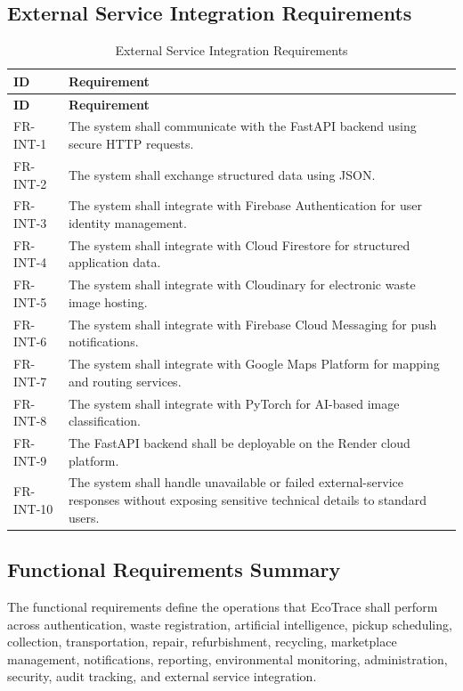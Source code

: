 \subsection{External Service Integration Requirements}
\begin{longtable}{@{}p{2.4cm}p{11cm}@{}}
\caption{External Service Integration Requirements} \label{tab:fr-int} \\
\toprule \textbf{ID} & \textbf{Requirement} \\ \midrule
\endfirsthead
\toprule \textbf{ID} & \textbf{Requirement} \\ \midrule
\endhead
FR-INT-1 & The system shall communicate with the FastAPI backend using secure HTTP requests. \\
FR-INT-2 & The system shall exchange structured data using JSON. \\
FR-INT-3 & The system shall integrate with Firebase Authentication for user identity management. \\
FR-INT-4 & The system shall integrate with Cloud Firestore for structured application data. \\
FR-INT-5 & The system shall integrate with Cloudinary for electronic waste image hosting. \\
FR-INT-6 & The system shall integrate with Firebase Cloud Messaging for push notifications. \\
FR-INT-7 & The system shall integrate with Google Maps Platform for mapping and routing services. \\
FR-INT-8 & The system shall integrate with PyTorch for AI-based image classification. \\
FR-INT-9 & The FastAPI backend shall be deployable on the Render cloud platform. \\
FR-INT-10 & The system shall handle unavailable or failed external-service responses without exposing sensitive technical details to standard users. \\
\bottomrule
\end{longtable}

\subsection{Functional Requirements Summary}
The functional requirements define the operations that EcoTrace shall perform
across authentication, waste registration, artificial intelligence, pickup
scheduling, collection, transportation, repair, refurbishment, recycling,
marketplace management, notifications, reporting, environmental monitoring,
administration, security, audit tracking, and external service integration.

